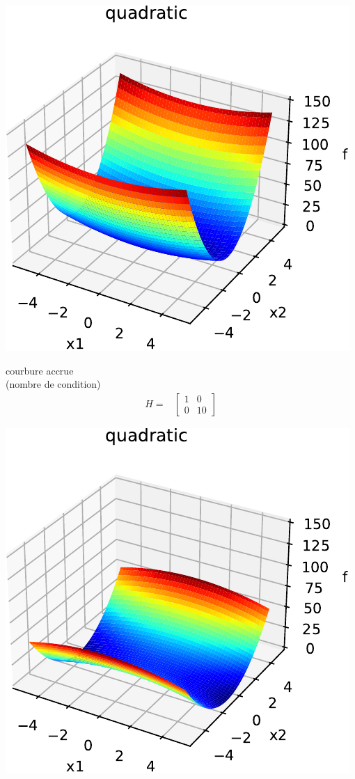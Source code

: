 \documentclass[12pt]{beamer}
\begin{document}
\begin{frame}
\begin{itemize}
\begin{frame}[allowframebreaks]
\begin{minipage}{0.5\textwidth}
\includegraphics[width=\textwidth]{quad_rot0_cond10_H_1_0_0_10-crop.pdf}
\end{minipage}
\begin{minipage}{0.4\textwidth}
courbure accrue \\ 
(nombre de condition)
\begin{align*}
H =& \begin{bmatrix} 1 & 0 \\ 0 & 10\end{bmatrix}  
\end{align*}
\end{minipage}
\newpage
\begin{minipage}{0.5\textwidth}
\includegraphics[width=\textwidth]{quad_rot0_condm5_H_m1_0_0_5-crop.pdf}

\end{minipage}
\end{frame}
\end{itemize}
\end{frame}
\end{document}

